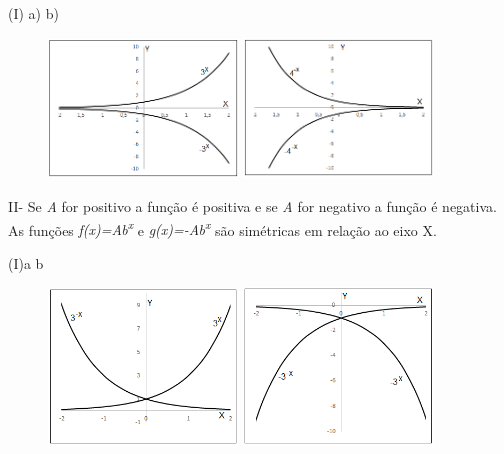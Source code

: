 \begin{respostas}{3}
	\ansitem{} (I) a) \tab b)

\begin{figure}[H]
    \includegraphics[width=0.45\textwidth]{capitulos/potencias_e_funcoes_exponenciais/media/image21.png} 
    \includegraphics[width=0.45\textwidth]{capitulos/potencias_e_funcoes_exponenciais/media/image22.png}
\end{figure}

II- Se \textit{A} for positivo a função é positiva e se \textit{A} for negativo a função é negativa. As funções \textit{f(x)=Ab\textsuperscript{x}} e \textit{g(x)=-Ab\textsuperscript{x}} são simétricas em relação ao eixo X.

\ansitem{}  (I)a \tab b

\begin{figure}[H]
    \includegraphics[width=0.45\textwidth]{capitulos/potencias_e_funcoes_exponenciais/media/image23.png} 
    \includegraphics[width=0.45\textwidth]{capitulos/potencias_e_funcoes_exponenciais/media/image24.png}
\end{figure}


\end{respostas}
